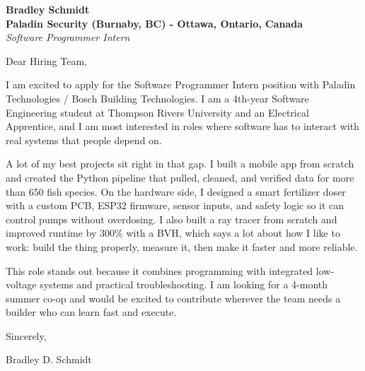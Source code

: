 \documentclass[11pt]{article}
\begin{document}
\textbf{Bradley Schmidt}\\
\vspace{0.5em}
\textbf{Paladin Security (Burnaby, BC) - Ottawa, Ontario, Canada}\\
\textit{Software Programmer Intern}

Dear Hiring Team,

\par

I am excited to apply for the Software Programmer Intern position with Paladin Technologies / Bosch Building Technologies. I am a 4th-year Software Engineering student at Thompson Rivers University and an Electrical Apprentice, and I am most interested in roles where software has to interact with real systems that people depend on.

\par

A lot of my best projects sit right in that gap. I built a mobile app from scratch and created the Python pipeline that pulled, cleaned, and verified data for more than 650 fish species. On the hardware side, I designed a smart fertilizer doser with a custom PCB, ESP32 firmware, sensor inputs, and safety logic so it can control pumps without overdosing. I also built a ray tracer from scratch and improved runtime by 300\% with a BVH, which says a lot about how I like to work: build the thing properly, measure it, then make it faster and more reliable.

\par

This role stands out because it combines programming with integrated low-voltage systems and practical troubleshooting. I am looking for a 4-month summer co-op and would be excited to contribute wherever the team needs a builder who can learn fast and execute.

\par

Sincerely,

\par

Bradley D. Schmidt
\end{document}
